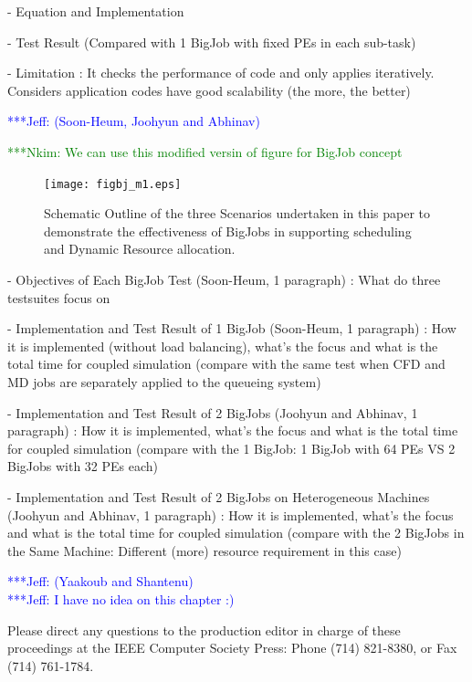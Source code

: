 \documentclass[times, 10pt,twocolumn]{article}
\newcommand{\Nkimnote}[1]{ {\textcolor{green} { ***Nkim: #1 }}}
\newcommand{\skonote}[1]{ {\textcolor{blue} { ***Jeff: #1 }}}
\newcommand{\Nkimnote}[1]{}
\newcommand{\skonote}[1]{}
\begin{document}
- Equation and Implementation

- Test Result (Compared with 1 BigJob with fixed PEs in each sub-task)

- Limitation
: It checks the performance of code and only applies iteratively. Considers application codes have good scalability (the more, the better)


\skonote{(Soon-Heum, Joohyun and Abhinav)}


\Nkimnote{ We can use this modified versin of figure for BigJob concept }
\begin{figure}
\centering
\texttt{[image: figbj\_m1.eps]}
\caption{Schematic Outline of the three Scenarios undertaken in this paper to demonstrate the effectiveness of BigJobs in supporting scheduling and Dynamic Resource allocation.}
\end{figure}

- Objectives of Each BigJob Test (Soon-Heum, 1 paragraph)
: What do three testsuites focus on

- Implementation and Test Result of 1 BigJob (Soon-Heum, 1 paragraph)
: How it is implemented (without load balancing), what's the focus and what is the total time for coupled simulation (compare with the same test when CFD and MD jobs are separately applied to the queueing system)

- Implementation and Test Result of 2 BigJobs (Joohyun and Abhinav, 1 paragraph)
: How it is implemented, what's the focus and what is the total time for coupled simulation (compare with the 1 BigJob: 1 BigJob with 64 PEs VS 2 BigJobs with 32 PEs each)

- Implementation and Test Result of 2 BigJobs on Heterogeneous Machines (Joohyun and Abhinav, 1 paragraph)
: How it is implemented, what's the focus and what is the total time for coupled simulation (compare with the 2 BigJobs in the Same Machine: Different (more) resource requirement in this case) 


\skonote{(Yaakoub and Shantenu)}\\
\skonote{I have no idea on this chapter :)}



Please direct any questions to the production editor in charge of these 
proceedings at the IEEE Computer Society Press: Phone (714) 821-8380, or 
Fax (714) 761-1784.
\end{document}
